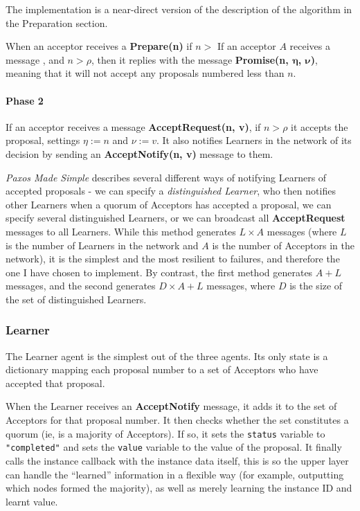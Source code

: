 \documentclass[12pt,twoside,notitlepage]{report}
\newcommand{\msg}[1] {{\bf #1}}         %
\begin{document}
The implementation is a near-direct version of the description of the algorithm in the Preparation
section.

When an acceptor receives a \msg{Prepare(n)} if $n > $
If an acceptor $A$ receives a message , and $n > \rho$, then it replies with the
message \msg{Promise(n, $\bm{\eta}$, $\bm{\nu}$)}, meaning that it will not accept any proposals
numbered less than $n$.

\paragraph{Phase 2}

If an acceptor receives a message \msg{AcceptRequest(n, v)}, if $n > \rho$ it accepts the
proposal, settings $\eta := n$ and $\nu := v$. It also notifies Learners in the network of its
decision by sending an \msg{AcceptNotify(n, v)} message to them.

\emph{Paxos Made Simple} \cite{lamport01} describes several different ways of notifying Learners
of accepted proposals - we can specify a \emph{distinguished Learner}, who then notifies
other Learners when a quorum of Acceptors has accepted a proposal, we can specify several
distinguished Learners, or we can broadcast all \msg{AcceptRequest} messages to all Learners.
While this method generates $L\times A$ messages (where $L$ is the number of Learners in the
network and $A$ is the number of Acceptors in the network), it is the simplest and the most
resilient to failures, and therefore the one I have chosen to implement. By contrast, the first
method generates $A + L$ messages, and the second generates $D\times A + L$ messages, where $D$ is
the size of the set of distinguished Learners.


\subsubsection{Learner}

The Learner agent is the simplest out of the three agents. Its only state is a dictionary mapping
each proposal number to a set of Acceptors who have accepted that proposal.

When the Learner receives an \msg{AcceptNotify} message, it adds it to the set of Acceptors for
that proposal number. It then checks whether the set constitutes a quorum (ie, is a majority of
Acceptors). If so, it sets the \verb+status+ variable to \verb+"completed"+ and sets the
\verb+value+ variable to the value of the proposal. It finally calls the instance callback with
the instance data itself, this is so the upper layer can handle the ``learned'' information in a
flexible way (for example, outputting which nodes formed the majority), as well as merely learning
the instance ID and learnt value.
\end{document}
